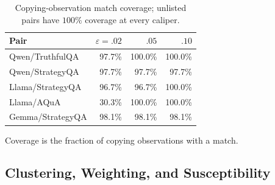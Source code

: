 \documentclass[11pt,a4paper]{article}
\theoremstyle{definition}
\begin{document}
\begin{table}[H]
\centering\scriptsize
\setlength{\tabcolsep}{3pt}
\renewcommand{\arraystretch}{1.0}
\caption{Copying-observation match coverage; unlisted pairs have $100\%$ coverage at every caliper.}
\label{tab:matched-coverage}
\begin{tabularx}{\columnwidth}{@{}Zrrr@{}}
\toprule
Pair & $\varepsilon=.02$ & $.05$ & $.10$\\
\midrule
Qwen/TruthfulQA & 97.7\% & 100.0\% & 100.0\%\\
Qwen/StrategyQA & 97.7\% & 97.7\% & 97.7\%\\
Llama/StrategyQA & 96.7\% & 96.7\% & 100.0\%\\
Llama/AQuA & 30.3\% & 100.0\% & 100.0\%\\
Gemma/StrategyQA & 98.1\% & 98.1\% & 98.1\%\\
\bottomrule
\end{tabularx}
\par\smallskip
\raggedright Coverage is the fraction of copying observations with a match.
\end{table}



\subsection{Clustering, Weighting, and Susceptibility}
\label{sec:app-tab-robustness}
\end{document}
